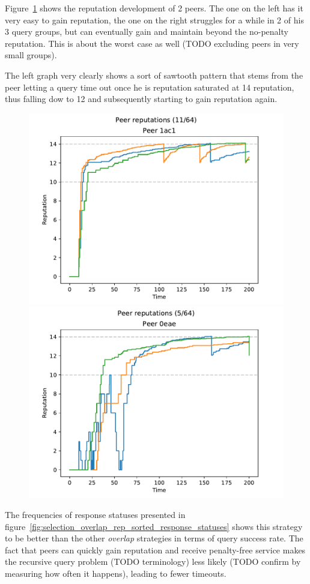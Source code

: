Figure~\ref{fig:selection_overlap_rep_sorted_peer_reps} shows the reputation
development of 2 peers. The one on the left has it very easy to gain reputation,
the one on the right struggles for a while in 2 of his 3 query groups, but can
eventually gain and maintain beyond the no-penalty reputation. This is about the
worst case as well (TODO excluding peers in very small groups).

The left graph very clearly shows a sort of sawtooth pattern that stems from the
peer letting a query time out once he is reputation saturated at 14 reputation,
thus falling dow to 12 and subsequently starting to gain reputation again.

\begin{figure}[t]
\centering
\includegraphics[width=0.49\columnwidth]{figures/selection_overlap_rep_sorted_peer_reps_11_of_64}
\includegraphics[width=0.49\columnwidth]{figures/selection_overlap_rep_sorted_peer_reps_5_of_64}
\label{fig:selection_overlap_rep_sorted_peer_reps}
\end{figure}

The frequencies of response statuses presented in
figure~\ref{fig:selection_overlap_rep_sorted_response_statuses} shows this
strategy to be better than the other \emph{overlap} strategies in terms of query
success rate. The fact that peers can quickly gain reputation and receive
penalty-free service makes the recursive query problem (TODO terminology) less
likely (TODO confirm by measuring how often it happens), leading to fewer
timeouts.

